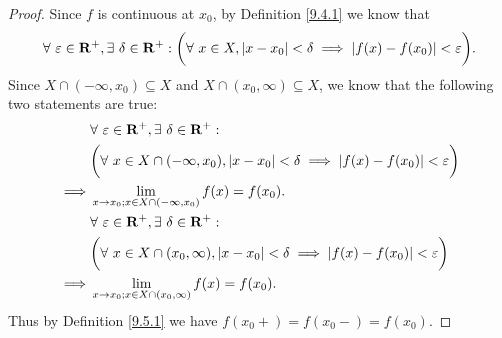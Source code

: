 \begin{proof}
    Since \(f\) is continuous at \(x_0\), by Definition \ref{9.4.1} we know that
    \[
        \forall\ \varepsilon \in \mathbf{R}^+, \exists\ \delta \in \mathbf{R}^+ : \bigg(\forall\ x \in X, \abs*{x - x_0} < \delta \implies \abs*{f(x) - f(x_0)} < \varepsilon\bigg).
    \]
    Since \(X \cap (-\infty, x_0) \subseteq X\) and \(X \cap (x_0, \infty) \subseteq X\), we know that the following two statements are true:
    \begin{align*}
        &\forall\ \varepsilon \in \mathbf{R}^+, \exists\ \delta \in \mathbf{R}^+ : \\
        &\bigg(\forall\ x \in X \cap (-\infty, x_0), \abs*{x - x_0} < \delta \implies \abs*{f(x) - f(x_0)} < \varepsilon\bigg) \\
        \implies & \lim_{x \to x_0 ; x \in X \cap (-\infty, x_0)} f(x) = f(x_0). \\
        &\forall\ \varepsilon \in \mathbf{R}^+, \exists\ \delta \in \mathbf{R}^+ : \\
        &\bigg(\forall\ x \in X \cap (x_0, \infty), \abs*{x - x_0} < \delta \implies \abs*{f(x) - f(x_0)} < \varepsilon\bigg) \\
        \implies & \lim_{x \to x_0 ; x \in X \cap (x_0, \infty)} f(x) = f(x_0).
    \end{align*}
    Thus by Definition \ref{9.5.1} we have \(f(x_0+) = f(x_0-) = f(x_0)\).
\end{proof}